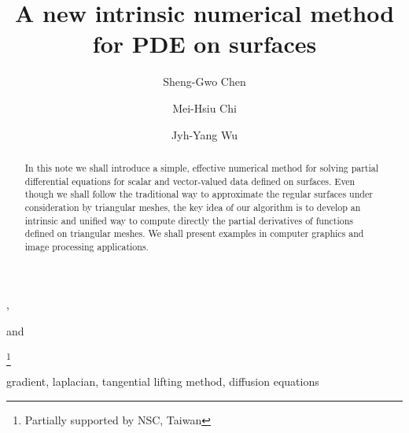 \documentclass{elsart}
\begin{document}
\begin{frontmatter}






\title{A new intrinsic numerical method for PDE on surfaces }

\author[Chen]{Sheng-Gwo
Chen},
\author[Chi_Wu]{Mei-Hsiu Chi} and
 \author[Chi_Wu]{Jyh-Yang Wu}

\address[Chen]{Department of Applied Mathematics, National Chiayi University,  Chia-Yi 600,
Taiwan.}
\address[Chi_Wu]{Department of Mathematics, National Chung Cheng
University, Chia-Yi 621, Taiwan}

\thanks[NSC]{ Partially supported by NSC, Taiwan}

\begin{abstract}

In this note we shall introduce a simple, effective numerical method
for solving partial differential equations for scalar and
vector-valued data defined on surfaces. Even though we shall follow
the traditional way to approximate the regular surfaces under
consideration by triangular meshes, the key idea of our algorithm is
to develop an intrinsic and unified way to compute directly the
partial derivatives of functions defined on triangular meshes. We
shall present examples in computer graphics and image processing
applications.

\end{abstract}

\begin{keyword}
gradient, laplacian, tangential lifting method, diffusion equations
\end{keyword}
\end{frontmatter}
\end{document}
